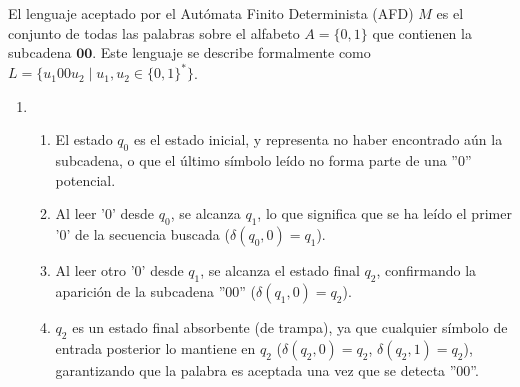 \begin{solucion}
El lenguaje aceptado por el Autómata Finito Determinista (AFD) $M$ es el conjunto de todas las palabras sobre el alfabeto $A = \{0, 1\}$ que contienen la subcadena $\mathbf{00}$.
Este lenguaje se describe formalmente como $L = \{u_1 00 u_2 \mid u_1, u_2 \in \{0, 1\}^{*}\}$.

\begin{enumerate}
    \item {}
    \begin{enumerate}
        \item El estado $q_0$ es el estado inicial, y representa no haber encontrado aún la subcadena, o que el último símbolo leído no forma parte de una ''0'' potencial.
        \item Al leer '0' desde $q_0$, se alcanza $q_1$, lo que significa que se ha leído el primer '0' de la secuencia buscada ($\delta(q_0, 0) = q_1$).
        \item Al leer otro '0' desde $q_1$, se alcanza el estado final $q_2$, confirmando la aparición de la subcadena ''00'' ($\delta(q_1, 0) = q_2$).
        \item $q_2$ es un estado final absorbente (de trampa), ya que cualquier símbolo de entrada posterior lo mantiene en $q_2$ ($\delta(q_2, 0) = q_2$, $\delta(q_2, 1) = q_2$), garantizando que la palabra es aceptada una vez que se detecta ''00''.
    \end{enumerate}
\end{enumerate}

\begin{figure}[H]
    \centering
    \label{fig:rel2_ej1}
\end{figure}





\end{solucion}

